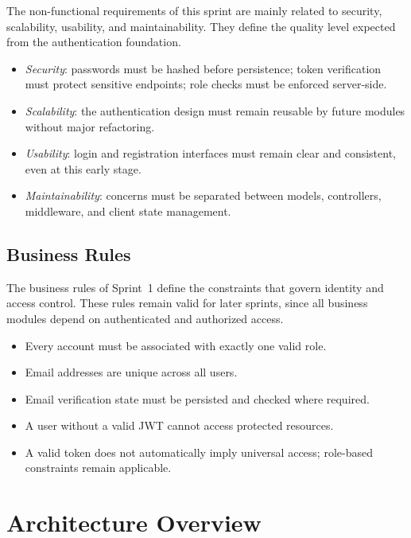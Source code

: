 \documentclass[a4paper,12pt]{report}
\begin{document}
The non-functional requirements of this sprint are mainly related to security, scalability, usability, and maintainability. They define the quality level expected from the authentication foundation.

\begin{itemize}[leftmargin=*]
  \item[--] \emph{Security}: passwords must be hashed before persistence; token verification must protect sensitive endpoints; role checks must be enforced server-side.
  \item[--] \emph{Scalability}: the authentication design must remain reusable by future modules without major refactoring.
  \item[--] \emph{Usability}: login and registration interfaces must remain clear and consistent, even at this early stage.
  \item[--] \emph{Maintainability}: concerns must be separated between models, controllers, middleware, and client state management.
\end{itemize}

\subsection{Business Rules}

The business rules of Sprint~1 define the constraints that govern identity and access control. These rules remain valid for later sprints, since all business modules depend on authenticated and authorized access.

\begin{itemize}[leftmargin=*]
  \item[--] Every account must be associated with exactly one valid role.
  \item[--] Email addresses are unique across all users.
  \item[--] Email verification state must be persisted and checked where required.
  \item[--] A user without a valid JWT cannot access protected resources.
  \item[--] A valid token does not automatically imply universal access; role-based constraints remain applicable.
\end{itemize}

\section{Architecture Overview}
\label{sec:sprint1-architecture}
\end{document}
